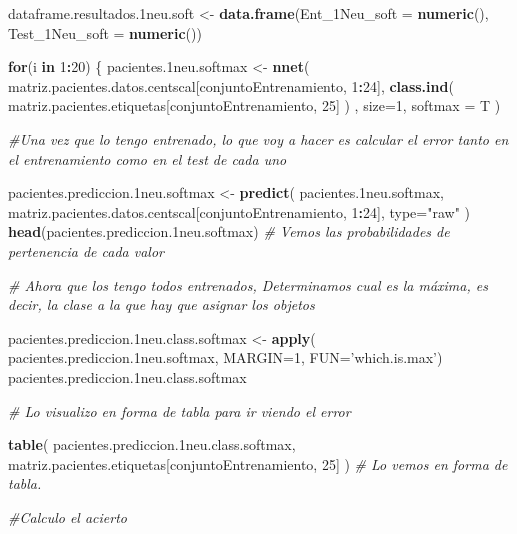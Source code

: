 \documentclass[]{article}
\newenvironment{Shaded}{\begin{snugshade}}{\end{snugshade}}
\newcommand{\KeywordTok}[1]{\textcolor[rgb]{0.13,0.29,0.53}{\textbf{#1}}}
\newcommand{\DataTypeTok}[1]{\textcolor[rgb]{0.13,0.29,0.53}{#1}}
\newcommand{\DecValTok}[1]{\textcolor[rgb]{0.00,0.00,0.81}{#1}}
\newcommand{\StringTok}[1]{\textcolor[rgb]{0.31,0.60,0.02}{#1}}
\newcommand{\CommentTok}[1]{\textcolor[rgb]{0.56,0.35,0.01}{\textit{#1}}}
\newcommand{\ControlFlowTok}[1]{\textcolor[rgb]{0.13,0.29,0.53}{\textbf{#1}}}
\newcommand{\OperatorTok}[1]{\textcolor[rgb]{0.81,0.36,0.00}{\textbf{#1}}}
\newcommand{\NormalTok}[1]{#1}
\begin{document}
\begin{Shaded}
\begin{Highlighting}[]
\NormalTok{dataframe.resultados.1neu.soft <-}\StringTok{ }\KeywordTok{data.frame}\NormalTok{(}\DataTypeTok{Ent_1Neu_soft =} \KeywordTok{numeric}\NormalTok{(),}
                                             \DataTypeTok{Test_1Neu_soft =} \KeywordTok{numeric}\NormalTok{())}

\ControlFlowTok{for}\NormalTok{(i }\ControlFlowTok{in} \DecValTok{1}\OperatorTok{:}\DecValTok{20}\NormalTok{)}
\NormalTok{\{}
\NormalTok{  pacientes.1neu.softmax <-}\StringTok{ }\KeywordTok{nnet}\NormalTok{( matriz.pacientes.datos.centscal[conjuntoEntrenamiento, }\DecValTok{1}\OperatorTok{:}\DecValTok{24}\NormalTok{], }\KeywordTok{class.ind}\NormalTok{( matriz.pacientes.etiquetas[conjuntoEntrenamiento, }\DecValTok{25}\NormalTok{] ) , }\DataTypeTok{size=}\DecValTok{1}\NormalTok{, }\DataTypeTok{softmax =}\NormalTok{ T )}

  \CommentTok{#Una vez que lo tengo entrenado, lo que voy a hacer es calcular el error tanto en el entrenamiento como en el test de cada uno}
  
\NormalTok{  pacientes.prediccion.1neu.softmax <-}\StringTok{ }\KeywordTok{predict}\NormalTok{( pacientes.1neu.softmax, matriz.pacientes.datos.centscal[conjuntoEntrenamiento, }\DecValTok{1}\OperatorTok{:}\DecValTok{24}\NormalTok{], }\DataTypeTok{type=}\StringTok{"raw"}\NormalTok{ )}
  \KeywordTok{head}\NormalTok{(pacientes.prediccion.1neu.softmax) }\CommentTok{# Vemos las probabilidades de pertenencia de cada valor}
  
  \CommentTok{# Ahora que los tengo todos entrenados, Determinamos cual es la máxima, es decir, la clase a la que hay que asignar los objetos}
  
\NormalTok{  pacientes.prediccion.1neu.class.softmax <-}\StringTok{ }\KeywordTok{apply}\NormalTok{( pacientes.prediccion.1neu.softmax, }\DataTypeTok{MARGIN=}\DecValTok{1}\NormalTok{, }\DataTypeTok{FUN=}\StringTok{'which.is.max'}\NormalTok{)}
\NormalTok{  pacientes.prediccion.1neu.class.softmax}
  
  \CommentTok{# Lo visualizo en forma de tabla para ir viendo el error}
  
  \KeywordTok{table}\NormalTok{( pacientes.prediccion.1neu.class.softmax, matriz.pacientes.etiquetas[conjuntoEntrenamiento, }\DecValTok{25}\NormalTok{] )  }\CommentTok{# Lo vemos en forma de tabla.}
  
  \CommentTok{#Calculo el acierto}
  

\end{Highlighting}
\end{Shaded}
\end{document}

